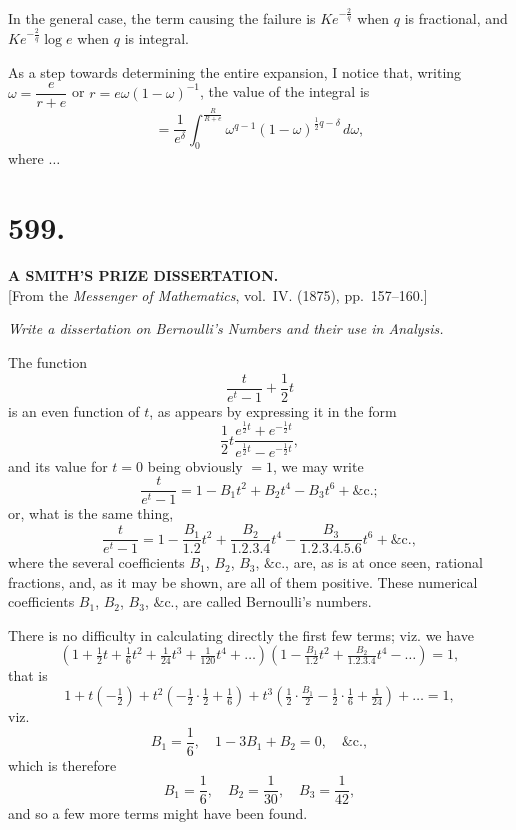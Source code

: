 \documentclass[11pt,a4paper]{book}
\begin{document}
In the general case, the term causing the failure is $Ke^{-\frac{2}{q}}$ when
$q$ is fractional, and $Ke^{-\frac{2}{q}}\log e$ when $q$ is integral.

As a step towards determining the entire expansion, I notice that, writing
$\omega = \dfrac{e}{r+e}$ or $r = e\omega(1-\omega)^{-1}$, the value of the
integral is
\[
= \frac{1}{e^{\delta}}\int_0^{\frac{R}{R+e}}
  \omega^{q-1}(1-\omega)^{\frac{1}{2}q-\delta}\,d\omega,
\]
where $\ldots$

\newpage
\section*{599.}
\begin{center}
{\large\bfseries A SMITH'S PRIZE DISSERTATION.}\\[0.5em]
[From the \textit{Messenger of Mathematics}, vol.~IV. (1875), pp.~157--160.]
\end{center}

\begin{center}
\textit{Write a dissertation on Bernoulli's Numbers and their use in Analysis.}
\end{center}

The function
\[
\frac{t}{e^t-1} + \frac{1}{2}t
\]
is an even function of $t$, as appears by expressing it in the form
\[
\frac{1}{2}t\frac{e^{\frac{1}{2}t}+e^{-\frac{1}{2}t}}{e^{\frac{1}{2}t}-e^{-\frac{1}{2}t}},
\]
and its value for $t=0$ being obviously $=1$, we may write
\[
\frac{t}{e^t-1} = 1 - B_1t^2 + B_2t^4 - B_3t^6 + \&\text{c.};
\]
or, what is the same thing,
\[
\frac{t}{e^t-1} = 1 - \frac{B_1}{1.2}t^2 + \frac{B_2}{1.2.3.4}t^4
  - \frac{B_3}{1.2.3.4.5.6}t^6 + \&\text{c.},
\]
where the several coefficients $B_1$, $B_2$, $B_3$, $\&$c., are, as is at once
seen, rational fractions, and, as it may be shown, are all of them positive.
These numerical coefficients $B_1$, $B_2$, $B_3$, $\&$c., are called Bernoulli's
numbers.

There is no difficulty in calculating directly the first few terms; viz. we
have
\[
\left(1 + \tfrac{1}{2}t + \tfrac{1}{6}t^2 + \tfrac{1}{24}t^3
  + \tfrac{1}{120}t^4 + \ldots\right)
\left(1 - \tfrac{B_1}{1.2}t^2 + \tfrac{B_2}{1.2.3.4}t^4 - \ldots\right) = 1,
\]
that is
\[
1 + t\left(-\tfrac{1}{2}\right)
  + t^2\left(-\tfrac{1}{2}\cdot\tfrac{1}{2} + \tfrac{1}{6}\right)
  + t^3\left(\tfrac{1}{2}\cdot\tfrac{B_1}{2} - \tfrac{1}{2}\cdot\tfrac{1}{6}
    + \tfrac{1}{24}\right) + \ldots = 1,
\]
viz.
\[
B_1 = \frac{1}{6},\quad
1 - 3B_1 + B_2 = 0, \quad \&\text{c.},
\]
which is therefore
\[
B_1 = \frac{1}{6}, \quad B_2 = \frac{1}{30}, \quad B_3 = \frac{1}{42},
\]
and so a few more terms might have been found.
\end{document}
